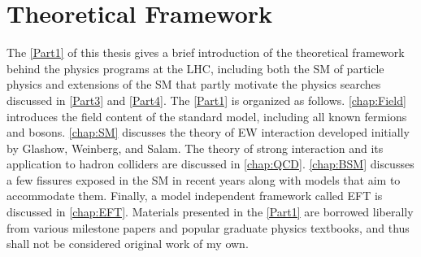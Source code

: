 \part{Theoretical Framework}
\label{Part1}
The \autoref{Part1} of this thesis gives a brief introduction of the theoretical framework behind the physics programs at the \ac{LHC}, including both the \ac{SM} of particle physics and extensions of the \ac{SM} that partly motivate the physics searches discussed in \autoref{Part3} and \autoref{Part4}. The \autoref{Part1} is organized as follows. \autoref{chap:Field} introduces the field content of the standard model, including all known fermions and bosons. \autoref{chap:SM} discusses the theory of \ac{EW} interaction developed initially by Glashow, Weinberg, and Salam. The theory of strong interaction and its application to hadron colliders are discussed in \autoref{chap:QCD}. \autoref{chap:BSM} discusses a few fissures exposed in the \ac{SM} in recent years along with models that aim to accommodate them. Finally, a model independent framework called \ac{EFT} is discussed in \autoref{chap:EFT}. Materials presented in the \autoref{Part1} are borrowed liberally from various milestone papers and popular graduate physics textbooks, and thus shall not be considered original work of my own. 






